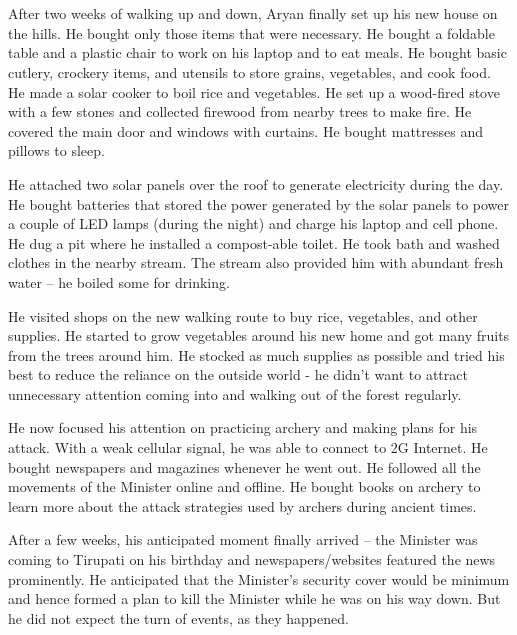 \chapter{}

After two weeks of walking up and down, Aryan finally set up his new house on
the hills. He bought only those items that were necessary. He bought a foldable
table and a plastic chair to work on his laptop and to eat meals. He bought
basic cutlery, crockery items, and utensils to store grains, vegetables, and
cook food. He made a solar cooker to boil rice and vegetables. He set up a
wood-fired stove with a few stones and collected firewood from nearby trees to
make fire. He covered the main door and windows with curtains. He bought
mattresses and pillows to sleep.

He attached two solar panels over the roof to generate electricity during the
day. He bought batteries that stored the power generated by the solar panels to
power a couple of LED lamps (during the night) and charge his laptop and cell
phone. He dug a pit where he installed a compost-able toilet. He took bath and
washed clothes in the nearby stream. The stream also provided him with abundant
fresh water – he boiled some for drinking.

He visited shops on the new walking route to buy rice, vegetables, and other
supplies. He started to grow vegetables around his new home and got many fruits
from the trees around him. He stocked as much supplies as possible and tried his
best to reduce the reliance on the outside world - he didn't want to attract
unnecessary attention coming into and walking out of the forest regularly.

He now focused his attention on practicing archery and making plans for his
attack. With a weak cellular signal, he was able to connect to 2G Internet. He
bought newspapers and magazines whenever he went out. He followed all the
movements of the Minister online and offline. He bought books on archery to
learn more about the attack strategies used by archers during ancient times.

After a few weeks, his anticipated moment finally arrived – the Minister was
coming to Tirupati on his birthday and newspapers/websites featured the news
prominently. He anticipated that the Minister's security cover would be minimum
and hence formed a plan to kill the Minister while he was on his way down. But
he did not expect the turn of events, as they happened.
